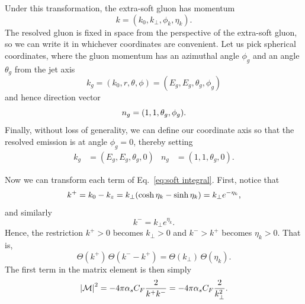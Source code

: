 \documentclass[11pt,twoside,reqno]{amsart}
\theoremstyle{plain}
\theoremstyle{remark}
\theoremstyle{definition}
\theoremstyle{remark}
\theoremstyle{definition}
\theoremstyle{definition}
\newcommand{\cM}{\mathcal{M}}
\begin{document}
	Under this transformation, the extra-soft gluon has momentum
	\begin{equation}
		k = (k_0, k_\perp, \phi_k, \eta_k).
	\end{equation}
	The resolved gluon is fixed in space from the perspective of the extra-soft gluon, so we can write it in whichever coordinates are convenient. Let us pick spherical coordinates, where the gluon momentum has an azimuthal angle $\phi_g$ and an angle $\theta_g$ from the jet axis
	\begin{equation}
		k_g = (k_0, r, \theta, \phi) = (E_g, E_g, \theta_g, \phi_g)
	\end{equation}
	and hence direction vector
	\begin{equation}
		n_g = \qty(1, 1, \theta_g, \phi_g).
	\end{equation}
	Finally, without loss of generality, we can define our coordinate axis so that the resolved emission is at angle $\phi_g = 0$, thereby setting
	\begin{equation}
	\begin{aligned}
		k_g &= (E_g, E_g, \theta_g, 0) & n_g &= (1, 1, \theta_g, 0).
	\end{aligned}
	\end{equation}

	Now we can transform each term of Eq.~\ref{eq:soft integral}. First, notice that
	\begin{equation}
		k^+ = k_0 - k_z = k_\perp \qty(\cosh\eta_k - \sinh\eta_k) = k_\perp e^{-\eta_k},
	\end{equation}
	and similarly
	\begin{equation}
		k^- = k_\perp e^{\eta_k}.
	\end{equation}
	Hence, the restriction $k^+ > 0$ becomes $k_\perp > 0$ and $k^- > k^+$ becomes $\eta_k > 0$. That is,
	\begin{equation}
		\Theta(k^+)\,\Theta(k^- - k^+) = \Theta(k_\perp)\,\Theta(\eta_k).
	\end{equation}
	The first term in the matrix element is then simply
	\begin{equation}
		\abs{\cM}^2 = -4\pi\alpha_sC_F\frac{2}{k^+ k^-} = -4\pi\alpha_sC_F\frac{2}{k_\perp^2}.
	\end{equation}
\end{document}
